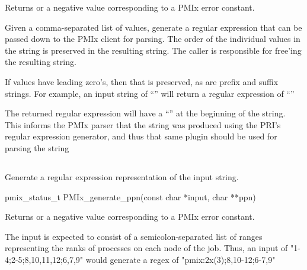Returns  or a negative value corresponding to a PMIx error constant.

\descr

Given a comma-separated list of  values, generate a regular expression that can be passed down to the \ac{PMIx} client for parsing.
The order of the individual values in the  string is preserved in the resulting  string.
The caller is responsible for free'ing the resulting string.

If values have leading zero's, then that is preserved, as are prefix and suffix strings. For example, an input string of ``'' will return a regular expression of ``''

\adviceuserstart
The returned regular expression will have a ``'' at the beginning of the string. This informs the \ac{PMIx} parser that the string was produced using the \ac{PRI}'s regular expression generator, and thus that same plugin should be used for parsing the string
\adviceuserend


\subsection{}

\summary

Generate a regular expression representation of the input string.

\format

\cspecificstart
\begin{codepar}
pmix_status_t PMIx_generate_ppn(const char *input, char **ppn)
\end{codepar}
\cspecificend

\begin{arglist}
\end{arglist}

Returns  or a negative value corresponding to a PMIx error constant.

\descr

The input is expected to consist of a semicolon-separated list of ranges representing the ranks of processes on each node of the job. Thus, an input of "1-4;2-5;8,10,11,12;6,7,9" would generate a regex of "pmix:2x(3);8,10-12;6-7,9"

